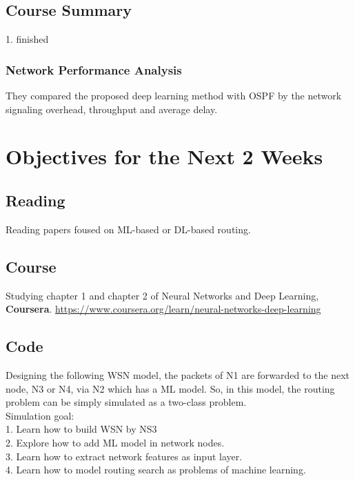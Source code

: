 \documentclass[11pt]{report}
\begin{document}
	\subsection{Course Summary}
	1. finished 

	
	\subsubsection{Network Performance Analysis}
	They compared the proposed deep learning method with OSPF by the network signaling overhead, throughput and average delay.
	
	\section{Objectives for the Next 2 Weeks}
	\subsection{Reading} 
	Reading papers foused on ML-based or DL-based routing.
	\subsection{Course} 
	Studying chapter 1 and chapter 2 of Neural Networks and Deep Learning, \textbf{Coursera}. \url{https://www.coursera.org/learn/neural-networks-deep-learning}
	\subsection{Code}
	Designing the following WSN model, the packets of N1 are forwarded to the next node, N3 or N4, via N2 which has a ML model. So, in this model, the routing problem can be simply simulated as a two-class problem.\\
	
	\noindent Simulation goal:\\
	1. Learn how to build WSN by NS3\\
	2. Explore how to add ML model in network nodes.\\
	3. Learn how to extract network features as input layer.\\
	4. Learn how to model routing search as problems of machine learning.\\
	
\end{document}
